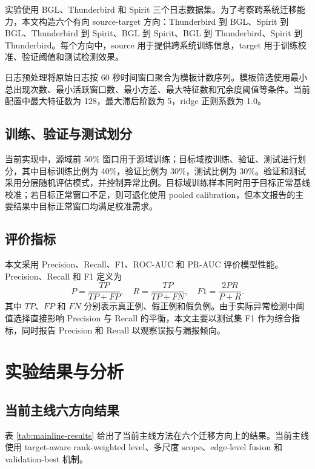 \documentclass[UTF8,a4paper,zihao=-4]{ctexart}
\begin{document}
实验使用 BGL、Thunderbird 和 Spirit 三个日志数据集。为了考察跨系统迁移能力，本文构造六个有向 source-target 方向：Thunderbird 到 BGL、Spirit 到 BGL、Thunderbird 到 Spirit、BGL 到 Spirit、BGL 到 Thunderbird、Spirit 到 Thunderbird。每个方向中，source 用于提供跨系统训练信息，target 用于训练校准、验证阈值和测试检测效果。

日志预处理将原始日志按 60 秒时间窗口聚合为模板计数序列。模板筛选使用最小总出现次数、最小活跃窗口数、最小方差、最大特征数和冗余度阈值等条件。当前配置中最大特征数为 128，最大滞后阶数为 5，ridge 正则系数为 1.0。

\subsection{训练、验证与测试划分}

当前实现中，源域前 50\% 窗口用于源域训练；目标域按训练、验证、测试进行划分，其中目标训练比例为 40\%，验证比例为 30\%，测试比例为 30\%。验证和测试采用分层随机评估模式，并控制异常比例。目标域训练样本同时用于目标正常基线校准；若目标正常窗口不足，则可退化使用 pooled calibration，但本文报告的主要结果中目标正常窗口均满足校准需求。

\subsection{评价指标}

本文采用 Precision、Recall、F1、ROC-AUC 和 PR-AUC 评价模型性能。Precision、Recall 和 F1 定义为
\begin{equation}
  P=\frac{TP}{TP+FP}, \quad
  R=\frac{TP}{TP+FN}, \quad
  F1=\frac{2PR}{P+R}.
\end{equation}
其中 $TP$、$FP$ 和 $FN$ 分别表示真正例、假正例和假负例。由于实际异常检测中阈值选择直接影响 Precision 与 Recall 的平衡，本文主要以测试集 F1 作为综合指标，同时报告 Precision 和 Recall 以观察误报与漏报倾向。

\section{实验结果与分析}

\subsection{当前主线六方向结果}

表 \ref{tab:mainline-results} 给出了当前主线方法在六个迁移方向上的结果。当前主线使用 target-aware rank-weighted level、多尺度 scope、edge-level fusion 和 validation-best 机制。
\end{document}
